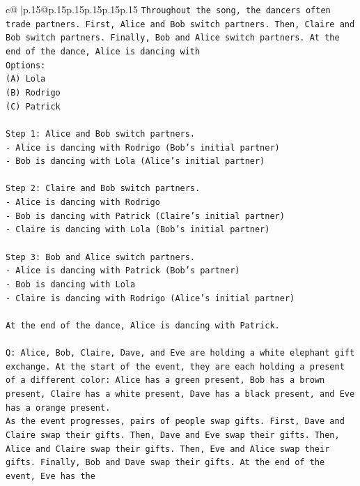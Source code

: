 \documentclass{article}
\begin{document}
{\begin{supertabular}{c@{$\;$}|p{.15\linewidth}@{}p{.15\linewidth}p{.15\linewidth}p{.15\linewidth}p{.15\linewidth}p{.15\linewidth}}
{{{\texttt{Throughout the song, the dancers often trade partners. First, Alice and Bob switch partners. Then, Claire and Bob switch partners. Finally, Bob and Alice switch partners. At the end of the dance, Alice is dancing with} \\
\texttt{Options:} \\
\texttt{(A) Lola} \\
\texttt{(B) Rodrigo} \\
\texttt{(C) Patrick} \\
\\ 
\texttt{Step 1: Alice and Bob switch partners.} \\
\texttt{{-} Alice is dancing with Rodrigo (Bob's initial partner)} \\
\texttt{{-} Bob is dancing with Lola (Alice's initial partner)} \\
\\ 
\texttt{Step 2: Claire and Bob switch partners.} \\
\texttt{{-} Alice is dancing with Rodrigo} \\
\texttt{{-} Bob is dancing with Patrick (Claire's initial partner)} \\
\texttt{{-} Claire is dancing with Lola (Bob's initial partner)} \\
\\ 
\texttt{Step 3: Bob and Alice switch partners.} \\
\texttt{{-} Alice is dancing with Patrick (Bob's partner)} \\
\texttt{{-} Bob is dancing with Lola} \\
\texttt{{-} Claire is dancing with Rodrigo (Alice's initial partner)} \\
\\ 
\texttt{At the end of the dance, Alice is dancing with Patrick.} \\
\\ 
\texttt{Q: Alice, Bob, Claire, Dave, and Eve are holding a white elephant gift exchange. At the start of the event, they are each holding a present of a different color: Alice has a green present, Bob has a brown present, Claire has a white present, Dave has a black present, and Eve has a orange present.} \\
\texttt{As the event progresses, pairs of people swap gifts. First, Dave and Claire swap their gifts. Then, Dave and Eve swap their gifts. Then, Alice and Claire swap their gifts. Then, Eve and Alice swap their gifts. Finally, Bob and Dave swap their gifts. At the end of the event, Eve has the} \\
}}}
\end{supertabular}}
\end{document}
